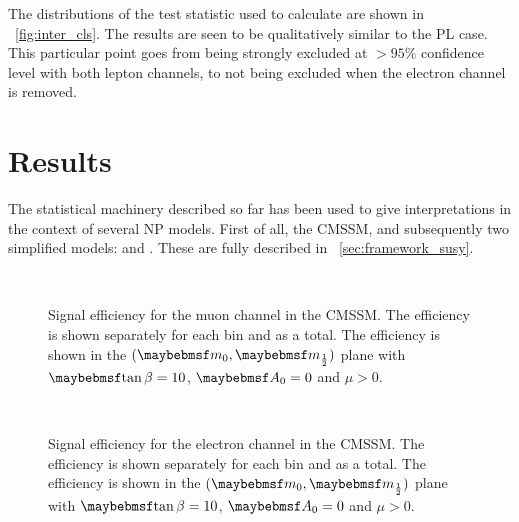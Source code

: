 The distributions of the test statistic used to calculate \CLs are shown in
\fig~\ref{fig:inter_cls}. The results are seen to be qualitatively similar to
the \ac{PL} case. This particular point goes from being strongly excluded at $>
95\%$ confidence level with both lepton channels, to not being excluded when the
electron channel is removed.

\section{Results}
The statistical machinery described so far has been used to give interpretations
in the context of several \ac{NP} models. First of all, the \ac{CMSSM}, and
subsequently two simplified models: \Ttwott and \TthreeW. These are fully
described in \sec~\ref{sec:framework_susy}.

\begin{figure}
\centering
{}
\\
\caption[Signal efficiency for the muon channel in the \acs{CMSSM}]{Signal
  efficiency for the muon channel in the \ac{CMSSM}. The efficiency is shown
  separately for each \STlep bin and as a total. The efficiency is shown in the
  $(\Mzero, \Mhalf)$ plane with $\tanbeta=10$, $\Azero=0$ and $\mu > 0$.}
\label{fig:inter_msugra_mu}
\end{figure}

\begin{figure}
\centering
{}
\\
\caption[Signal efficiency for the electron channel in the \acs{CMSSM}]{Signal
  efficiency for the electron channel in the \ac{CMSSM}. The efficiency is shown
  separately for each \STlep bin and as a total. The efficiency is shown in the
  $(\Mzero, \Mhalf)$ plane with $\tanbeta=10$, $\Azero=0$ and $\mu > 0$.}
\label{fig:inter_msugra_el}
\end{figure}

